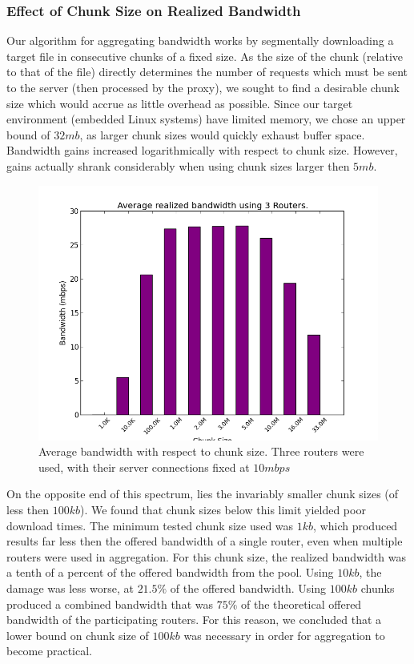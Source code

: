 \documentclass[12pt]{article}
\begin{document}
	\subsubsection{Effect of Chunk Size on Realized Bandwidth}
		Our algorithm for aggregating bandwidth works by segmentally downloading a target file in consecutive chunks of a fixed size. As the size of the chunk (relative to that of the file) directly determines the number of requests which must be sent to the server (then processed by the proxy), we sought to find a desirable chunk size which would accrue as little overhead as possible. Since our target environment (embedded Linux systems) have limited memory, we chose an upper bound of $32 mb$, as larger chunk sizes would quickly exhaust buffer space. Bandwidth gains increased logarithmically with respect to chunk size. However, gains actually shrank considerably when using chunk sizes larger then $5 mb$. 
		
		\begin{figure}[H]
			\centering
			\includegraphics[keepaspectratio=true,scale=0.5]{all_sizes.png}
			\caption{Average bandwidth with respect to chunk size. Three routers were used, with their server connections fixed at $10 mbps$}
		\end{figure}

		On the opposite end of this spectrum, lies the invariably smaller chunk sizes (of less then $100 kb$). We found that chunk sizes below this limit yielded poor download times. The minimum tested chunk size used was $1 kb$, which produced results far less then the offered bandwidth of a single router, even when multiple routers were used in aggregation. For this chunk size, the realized bandwidth was a tenth of a percent of the offered bandwidth from the pool. Using $10 kb$, the damage was less worse, at $21.5\%$ of the offered bandwidth. Using $100 kb$ chunks produced a combined bandwidth that was $75\%$ of the theoretical offered bandwidth of the participating routers. For this reason, we concluded that a lower bound on chunk size of $100 kb$ was necessary in order for aggregation to become practical.
\end{document}
